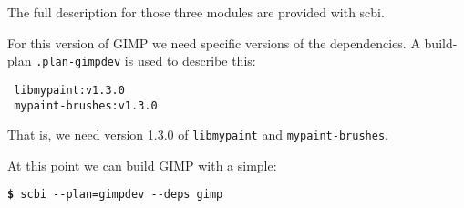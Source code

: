 \documentclass[a4paper,12pt,twoside]{article}
\newcommand{\code}[1]{\texttt{#1}}
\newcommand{\cmd}[1]{\tabto{1cm}\hspace{0.5cm}\texttt{\textbf{\$} #1}}
\newcommand{\ddash}{-{}-}
\begin{document}
The full description for those three modules are provided with scbi.

For this version of GIMP we need specific versions of the dependencies. A build-plan \code{.plan-gimpdev} is used to describe this:

\begin{lstlisting}
 libmypaint:v1.3.0
 mypaint-brushes:v1.3.0
\end{lstlisting}

That is, we need version 1.3.0 of \code{libmypaint} and \code{mypaint-brushes}.

At this point we can build GIMP with a simple:

\cmd{scbi \ddash{}plan=gimpdev \ddash{}deps gimp}

\printindex

\end{document}
